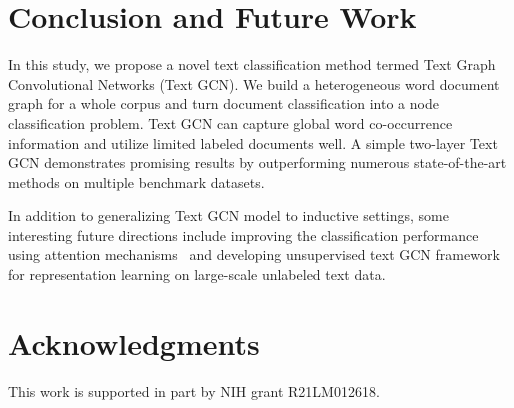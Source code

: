 \documentclass[letterpaper]{article} \usepackage{aaai19}  \usepackage{times}  \usepackage{helvet}  \usepackage{courier}  \usepackage{url}  \usepackage{graphicx}  \frenchspacing  \usepackage{amsmath}
\begin{document}
\section{Conclusion and Future Work}
In this study, we propose a novel text classification method termed Text Graph Convolutional Networks (Text GCN). We build a heterogeneous word document graph for a whole corpus and turn document classification into a node classification problem. Text GCN can capture global word co-occurrence information and utilize limited labeled documents well. A simple two-layer Text GCN demonstrates promising results by outperforming numerous state-of-the-art methods on multiple benchmark datasets.


In addition to generalizing Text GCN model to inductive settings, some interesting future directions include improving the classification performance using attention mechanisms~\cite{velivckovic2017graph} and developing unsupervised text GCN framework for representation learning on large-scale unlabeled text data. 

\section*{Acknowledgments}

This work is supported in part by NIH grant R21LM012618.




\end{document}
